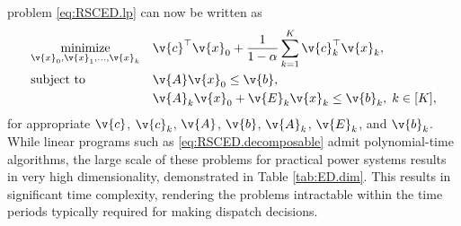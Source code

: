 problem \eqref{eq:RSCED.lp} can now be written as
%
\begin{equation}
\begin{aligned}
    &\underset{\v{x}_0, \v{x}_1, \dots, \v{x}_k}{\text{minimize}} && \v{c}^\top \v{x}_0 + \frac{1}{1 - \alpha} \sum_{k = 1}^K \v{c}_k^\top \v{x}_k, \\
    &\text{subject to} && \v{A} \v{x}_0 \le \v{b}, \\
    &&& \v{A}_k \v{x}_0 + \v{E}_k \v{x}_k \le \v{b}_k, \; k\in[K],
\end{aligned}
\label{eq:RSCED.decomposable}
\end{equation}
for appropriate $\v{c}$, $\v{c}_k$, $\v{A}$, $\v{b}$, $\v{A}_k$, $\v{E}_k$, and $\v{b}_k$.
%
While linear programs such as \eqref{eq:RSCED.decomposable} admit polynomial-time algorithms, the large scale of these problems for practical power systems results in very high dimensionality, demonstrated in Table \ref{tab:ED.dim}. This results in significant time complexity, rendering the problems intractable within the time periods typically required for making dispatch decisions. 


